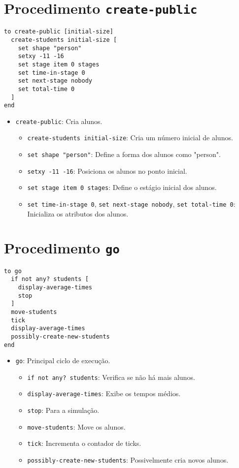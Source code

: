 \documentclass{article}
\begin{document}
\section{Procedimento \texttt{create-public}}

\begin{lstlisting}[language=NetLogo]
to create-public [initial-size]
  create-students initial-size [
    set shape "person"
    setxy -11 -16
    set stage item 0 stages
    set time-in-stage 0
    set next-stage nobody
    set total-time 0
  ]
end
\end{lstlisting}

\begin{itemize}
    \item \texttt{create-public}: Cria alunos.
    \begin{itemize}
        \item \texttt{create-students initial-size}: Cria um número inicial de alunos.
        \item \texttt{set shape "person"}: Define a forma dos alunos como "person".
        \item \texttt{setxy -11 -16}: Posiciona os alunos no ponto inicial.
        \item \texttt{set stage item 0 stages}: Define o estágio inicial dos alunos.
        \item \texttt{set time-in-stage 0}, \texttt{set next-stage nobody}, \texttt{set total-time 0}: Inicializa os atributos dos alunos.
    \end{itemize}
\end{itemize}

\section{Procedimento \texttt{go}}

\begin{lstlisting}[language=NetLogo]
to go
  if not any? students [
    display-average-times
    stop
  ]
  move-students
  tick
  display-average-times
  possibly-create-new-students
end
\end{lstlisting}

\begin{itemize}
    \item \texttt{go}: Principal ciclo de execução.
    \begin{itemize}
        \item \texttt{if not any? students}: Verifica se não há mais alunos.
        \item \texttt{display-average-times}: Exibe os tempos médios.
        \item \texttt{stop}: Para a simulação.
        \item \texttt{move-students}: Move os alunos.
        \item \texttt{tick}: Incrementa o contador de ticks.
        \item \texttt{possibly-create-new-students}: Possivelmente cria novos alunos.
    \end{itemize}
\end{itemize}
\end{document}
